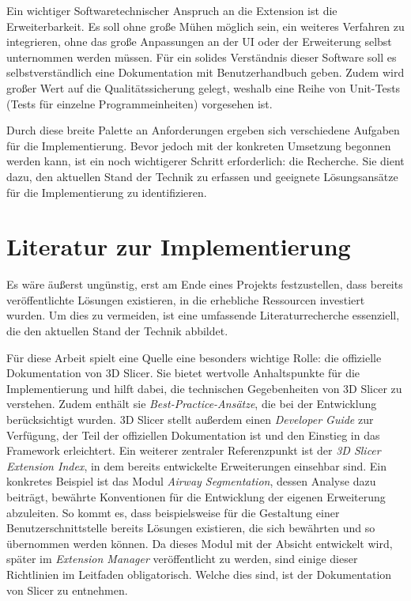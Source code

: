 Ein wichtiger Softwaretechnischer Anspruch an die Extension ist die
Erweiterbarkeit. Es soll ohne große Mühen möglich sein, ein weiteres Verfahren
zu integrieren, ohne das große Anpassungen an der \ac{UI} oder der Erweiterung selbst
unternommen werden müssen. Für ein solides Verständnis dieser Software soll es
selbstverständlich eine Dokumentation mit Benutzerhandbuch geben. Zudem wird großer
Wert auf die Qualitätssicherung gelegt, weshalb eine Reihe von Unit-Tests (Tests
für einzelne Programmeinheiten) vorgesehen ist.

Durch diese breite Palette an Anforderungen ergeben sich verschiedene Aufgaben
für die Implementierung. Bevor jedoch mit der konkreten Umsetzung begonnen werden
kann, ist ein noch wichtigerer Schritt erforderlich: die Recherche. Sie dient
dazu, den aktuellen Stand der Technik zu erfassen und geeignete Lösungsansätze für
die Implementierung zu identifizieren.

\section{Literatur zur Implementierung}
Es wäre äußerst ungünstig, erst am Ende eines Projekts festzustellen, dass bereits
veröffentlichte Lösungen existieren, in die erhebliche Ressourcen investiert
wurden. Um dies zu vermeiden, ist eine umfassende Literaturrecherche essenziell,
die den aktuellen Stand der Technik abbildet.

Für diese Arbeit spielt eine Quelle eine besonders wichtige Rolle: die
offizielle Dokumentation von 3D Slicer. Sie bietet wertvolle Anhaltspunkte für die
Implementierung und hilft dabei, die technischen Gegebenheiten von 3D Slicer zu
verstehen. Zudem enthält sie \textit{Best-Practice-Ansätze}, die bei der Entwicklung
berücksichtigt wurden. 3D Slicer stellt außerdem einen \textit{Developer Guide} zur
Verfügung, der Teil der offiziellen Dokumentation ist und den Einstieg in das
Framework erleichtert. Ein weiterer zentraler Referenzpunkt ist der \textit{3D
Slicer Extension Index}, in dem bereits entwickelte Erweiterungen einsehbar sind.
Ein konkretes Beispiel ist das Modul \textit{Airway Segmentation}, dessen
Analyse dazu beiträgt, bewährte Konventionen für die Entwicklung der eigenen Erweiterung
abzuleiten. So kommt es, dass beispielsweise für die Gestaltung einer Benutzerschnittstelle
bereits Lösungen existieren, die sich bewährten und so übernommen werden können.
Da dieses Modul mit der Absicht entwickelt wird, später im \textit{Extension
Manager} veröffentlicht zu werden, sind einige dieser Richtlinien im Leitfaden
obligatorisch. Welche dies sind, ist der Dokumentation von Slicer zu entnehmen.

